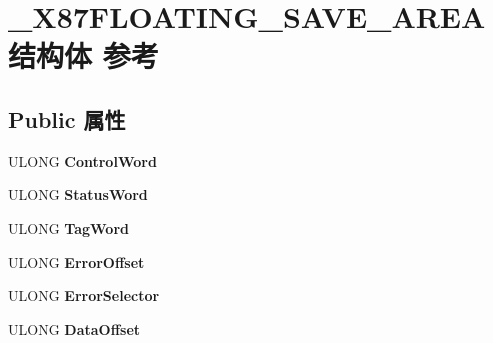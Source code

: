 \hypertarget{struct___x87_f_l_o_a_t_i_n_g___s_a_v_e___a_r_e_a}{}\section{\+\_\+\+X87\+F\+L\+O\+A\+T\+I\+N\+G\+\_\+\+S\+A\+V\+E\+\_\+\+A\+R\+E\+A结构体 参考}
\label{struct___x87_f_l_o_a_t_i_n_g___s_a_v_e___a_r_e_a}
\subsection*{Public 属性}
\begin{DoxyCompactItemize}
\item 
\mbox{\label{struct___x87_f_l_o_a_t_i_n_g___s_a_v_e___a_r_e_a_a123dc35d21ce427129a0da7e1505c21c}} 
U\+L\+O\+NG {\bfseries Control\+Word}
\item 
\mbox{\label{struct___x87_f_l_o_a_t_i_n_g___s_a_v_e___a_r_e_a_a117647a61980ca8387af80ef471a52a8}} 
U\+L\+O\+NG {\bfseries Status\+Word}
\item 
\mbox{\label{struct___x87_f_l_o_a_t_i_n_g___s_a_v_e___a_r_e_a_a6d22918941fdf7b62e48dbbb935581e1}} 
U\+L\+O\+NG {\bfseries Tag\+Word}
\item 
\mbox{\label{struct___x87_f_l_o_a_t_i_n_g___s_a_v_e___a_r_e_a_a3570d987fb3872746771484ca640d949}} 
U\+L\+O\+NG {\bfseries Error\+Offset}
\item 
\mbox{\label{struct___x87_f_l_o_a_t_i_n_g___s_a_v_e___a_r_e_a_af661857e8245c5b6b0de09f3ef09d0b1}} 
U\+L\+O\+NG {\bfseries Error\+Selector}
\item 
\mbox{\label{struct___x87_f_l_o_a_t_i_n_g___s_a_v_e___a_r_e_a_abaa1b9e1af0ddb7938053ee0655cdf1f}} 
U\+L\+O\+NG {\bfseries Data\+Offset}
\item 
\mbox{\label{struct___x87_f_l_o_a_t_i_n_g___s_a_v_e___a_r_e_a_a690b2e56cd64e8eadbd7a46a6371a48c}} 

\end{DoxyCompactItemize}
